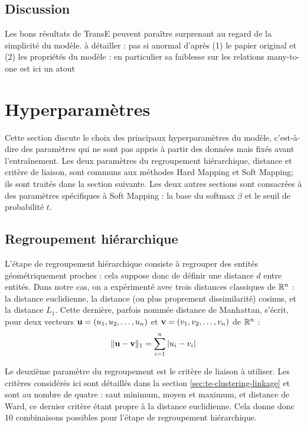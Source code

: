 \subsection{Discussion}
\label{subsec:te-discussion}

Les bons résultats de TransE peuvent paraître surprenant au regard de la simplicité du modèle. à détailler : pas si anormal d'après (1) le papier original et (2) les propriétés du modèle : en particulier sa faiblesse sur les relations many-to-one est ici un atout


\section{Hyperparamètres}
\label{sec:te-hp}

Cette section discute le choix des principaux hyperparamètres du modèle, c'est-à-dire des paramètres qui ne sont pas appris à partir des données mais fixés avant l'entraînement. Les deux paramètres du regroupement hiérarchique, distance et critère de liaison, sont communs aux méthodes Hard Mapping et Soft Mapping; ils sont traités dans la section suivante. Les deux autres sections sont consacrées à des paramètres spécifiques à Soft Mapping : la base du softmax $\beta$ et le seuil de probabilité $t$.

\subsection{Regroupement hiérarchique}

L'étape de regroupement hiérarchique consiste à regrouper des entités géométriquement proches : cela suppose donc de définir une distance $d$ entre entités. Dans notre cas, on a expérimenté avec trois distances classiques de $\R^n$ : la distance euclidienne,  la distance (ou plus proprement dissimilarité) cosinus, et la distance $L_1$. Cette dernière, parfois nommée distance de Manhattan, s'écrit, pour deux vecteurs $\bf{u} = (u_1, u_2, \ldots, u_n)$ et $\bf{v} = (v_1, v_2, \ldots, v_n)$ de $\R^n$ :
\begin{equation}
    \| \bf{u - v} \|_1 = \sum_{i=1}^{n} | u_i - v_i |
\end{equation}

Le deuxième paramètre du regroupement est le critère de liaison à utiliser. Les critères considérés ici sont détaillés dans la section \ref{sec:te-clustering-linkage} et sont au nombre de quatre : saut minimum, moyen et maximum, et distance de Ward, ce dernier critère étant propre à la distance euclidienne. Cela donne donc 10 combinaisons possibles pour l'étape de regroupement hiérarchique.

